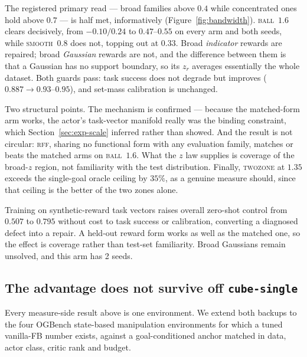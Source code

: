 The registered primary read --- broad families above $0.4$ while concentrated ones
hold above $0.7$ --- is half met, informatively (Figure~\ref{fig:bandwidth}). \textsc{ball}~$1.6$ clears
decisively, from $-0.10/0.24$ to $0.47$--$0.55$ on every arm and both seeds, while
\textsc{smooth}~$0.8$ does not, topping out at $0.33$. Broad \emph{indicator}
rewards are repaired; broad \emph{Gaussian} rewards are not, and the difference
between them is that a Gaussian has no support boundary, so its $z_r$ averages
essentially the whole dataset. Both guards pass: task success does not degrade but
improves ($0.887\to0.93$--$0.95$), and set-mass calibration is unchanged.

Two structural points. The mechanism is confirmed --- because the matched-form arm
works, the actor's task-vector manifold really was the binding constraint, which
Section~\ref{sec:exp-scale} inferred rather than showed. And the result is not
circular: \textsc{rff}, sharing no functional form with any evaluation family,
matches or beats the matched arms on \textsc{ball}~$1.6$. What the $z$ law supplies
is coverage of the broad-$z$ region, not familiarity with the test distribution.
Finally, \textsc{twozone} at $1.35$ exceeds the single-goal oracle ceiling by
$35\%$, as a genuine measure should, since that ceiling is the better of the two
zones alone.

\begin{takeaway}
Training on synthetic-reward task vectors raises overall zero-shot control from
$0.507$ to $0.795$ without cost to task success or calibration, converting a
diagnosed defect into a repair. A held-out reward form works as well as the
matched one, so the effect is coverage rather than test-set familiarity. Broad
Gaussians remain unsolved, and this arm has 2 seeds.
\end{takeaway}

\subsection{The advantage does not survive off \texttt{cube-single}}
\label{sec:exp-suite}

Every measure-side result above is one environment. We extend both backups to the
four OGBench state-based manipulation environments for which a tuned vanilla-FB
number exists, against a goal-conditioned anchor matched in data, actor class,
critic rank and budget.

